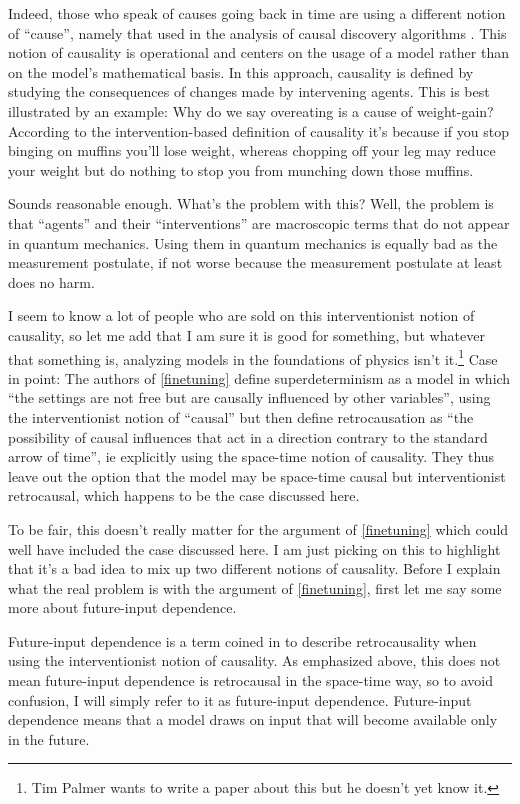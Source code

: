 \documentclass[11pt,twoside,A4]{article}
\begin{document}
Indeed, those who speak of causes going back in time are using a different notion of ``cause'', namely that used
in the analysis of causal discovery algorithms \cite{Pearl,Spirtes}. This notion of causality is operational and centers
on the usage of a model rather than on the model's mathematical basis. In this approach, causality is defined 
by studying the consequences of changes made by intervening agents.  This is best illustrated by an example: Why
do we say overeating is a cause of weight-gain? According to the intervention-based definition of causality
it's because if you stop binging on muffins you'll lose weight, whereas chopping
off your leg may reduce your weight but do nothing to stop you from munching down those muffins. 

Sounds reasonable enough. What's the problem with this? Well, the problem is that
``agents'' and their ``interventions'' are macroscopic terms that do not appear in quantum mechanics. 
Using them in quantum mechanics is equally bad as the measurement postulate, if not worse because the measurement postulate
at least does no harm. 

I seem to know a lot of people who are sold on this interventionist notion of causality, so let me add that I am
sure it is good for something, but whatever that something is, analyzing models in the foundations
of physics isn't it.\footnote{Tim Palmer wants to write a paper about this but he doesn't yet know it.} Case in
point: The authors of \ref{finetuning} define superdeterminism as a model in which ``the settings are not free but are
causally influenced by other variables'', using the interventionist notion of ``causal'' but then define retrocausation as
``the possibility of causal influences that act in a direction contrary to the standard arrow
of time'', ie explicitly using the space-time notion of causality. They thus leave out the option that the model may
be space-time causal but interventionist retrocausal, which happens to be the case discussed here. 

To be fair, this doesn't really matter for the argument of \ref{finetuning} which could well have included the
case discussed here. I am just picking on this to highlight that it's a bad idea to mix up two different
notions of causality. Before I explain what the real problem is with the argument of \ref{finetuning}, 
first let me say some more about future-input dependence. 

Future-input dependence is a term coined in \cite{Wharton} to describe retrocausality when using the interventionist notion
of causality. As emphasized above, this does not mean future-input dependence is retrocausal in the space-time way, so to avoid confusion,
I will simply refer to it as future-input dependence. Future-input dependence means that a model draws on 
input that will become available only in the future. 
\end{document}
